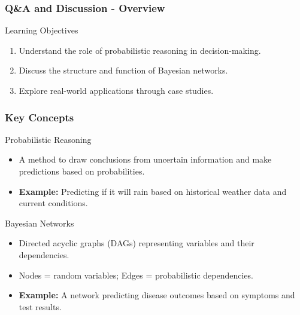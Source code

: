 \documentclass[aspectratio=169]{beamer}
\begin{document}
\begin{frame}[fragile]
  \frametitle{Q\&A and Discussion - Overview}
  \begin{block}{Learning Objectives}
    \begin{enumerate}
      \item Understand the role of probabilistic reasoning in decision-making.
      \item Discuss the structure and function of Bayesian networks.
      \item Explore real-world applications through case studies.
    \end{enumerate}
  \end{block}
\end{frame}

\begin{frame}[fragile]
  \frametitle{Key Concepts}
  \begin{block}{Probabilistic Reasoning}
    \begin{itemize}
      \item A method to draw conclusions from uncertain information and make predictions based on probabilities.
      \item \textbf{Example:} Predicting if it will rain based on historical weather data and current conditions.
    \end{itemize}
  \end{block}
  
  \begin{block}{Bayesian Networks}
    \begin{itemize}
      \item Directed acyclic graphs (DAGs) representing variables and their dependencies.
      \item Nodes = random variables; Edges = probabilistic dependencies.
      \item \textbf{Example:} A network predicting disease outcomes based on symptoms and test results.
    \end{itemize}
  \end{block}
\end{frame}
\end{document}
